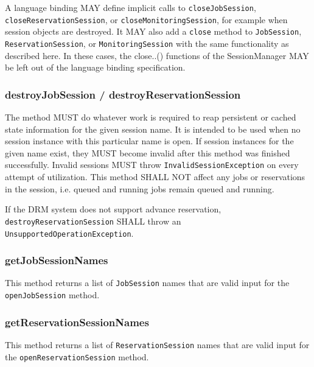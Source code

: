 \documentclass{article}
\newcommand{\h}[1]{\lstinline|#1|}
\newcommand{\langbind}[1]{\begin{shaded}#1\end{shaded}}
\newcommand{\rat}[1]{}
\begin{document}
\langbind{
A language binding MAY define implicit calls to \h{closeJobSession}, \h{closeReservationSession}, or \h{closeMonitoringSession}, for example when session objects are destroyed. It MAY also add a \h{close} method to \h{JobSession},  \h{ReservationSession}, or \h{MonitoringSession} with the same functionality as described here. In these cases, the close..() functions of the SessionManager MAY be left out of the language binding specification.
}

\rat{Conf call June 29th 2011: The closing of stateless monitoring sessions was intentionally kept, in order to allow an orderly shut down of the monitoring connection.}

\subsubsection{destroyJobSession / destroyReservationSession}

The method MUST do whatever work is required to reap persistent or cached state information for the given session name. It is intended to be used when no session instance with this particular name is open. If session instances for the given name exist, they MUST become invalid after this method was finished successfully. Invalid sessions MUST throw \h{InvalidSessionException} on every attempt of utilization. This method SHALL NOT affect any jobs or reservations in the session, i.e. queued and running jobs remain queued and running. 

If the DRM system does not support advance reservation, \h{destroyReservationSession} SHALL throw an \h{UnsupportedOperationException}.

\subsubsection{getJobSessionNames}

This method returns a list of \h{JobSession} names that are valid input for the \h{openJobSession} method.

\rat{June 29th 2011 conf call decided to make the method names explicit enough to see the return type.}

\subsubsection{getReservationSessionNames}

This method returns a list of \h{ReservationSession} names that are valid input for the \h{openReservationSession} method.
\end{document}
